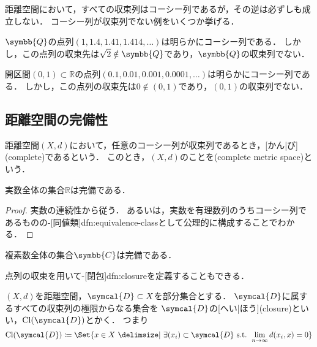 \documentclass[../sotsu.tex]{subfiles}
\begin{document}
距離空間において，すべての収束列はコーシー列であるが，その逆は必ずしも成立しない．
コーシー列が収束列でない例をいくつか挙げる．

\begin{example}
    $\symbb{Q}$の点列$(1, 1.4, 1.41, 1.414, \dotsc)$は明らかにコーシー列である．
    しかし，この点列の収束先は$\sqrt{2} \notin \symbb{Q}$であり，$\symbb{Q}$の収束列でない．
\end{example}

\begin{example}
    開区間$(0, 1) \subset ℝ$の点列$(0.1, 0.01, 0.001, 0.0001, \dotsc)$は明らかにコーシー列である．
    しかし，この点列の収束先は$0 \notin (0, 1)$であり，$(0, 1)$の収束列でない．
\end{example}


\subsection{距離空間の完備性}

\begin{definition}
    距離空間$(X, d)$において，任意のコーシー列が収束列であるとき，[かん|び](complete)であるという．
    このとき，$(X, d)$のことを(complete metric space)という．
\end{definition}


\begin{proposition}[実数の完備性]
    実数全体の集合$ℝ$は完備である．
\end{proposition}

\begin{proof}
    実数の連続性から従う．
    あるいは，実数を有理数列のうちコーシー列であるものの-[同値類]{dfn:equivalence-class}として公理的に構成することでわかる\cite[付録]{uchida-set-2020}．
\end{proof}


\begin{corollary}
    複素数全体の集合$\symbb{C}$は完備である．
\end{corollary}


点列の収束を用いて-[閉包]{dfn:closure}を定義することもできる．

\begin{definition}[点列による閉包の定義]
    \label{dfn:closure-by-sequence}
    $(X, d)$を距離空間，$\symcal{D} \subset X$を部分集合とする．
    $\symcal{D}$に属するすべての収束列の極限からなる集合を
    $\symcal{D}$の[へい|ほう](closure)といい，$\cl{\symcal{D}}$とかく．
    つまり
    \begin{equation}
        \cl{\symcal{D}} \coloneq \Set{ x \in X  \given  \exists (x_i) \subset \symcal{D} \text{ s.t. } \lim_{n \to \infty} d(x_i, x) = 0 }
    \end{equation}
\end{definition}
\end{document}

